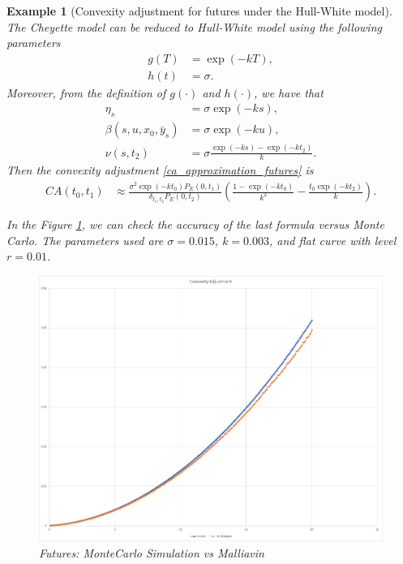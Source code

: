 \documentclass[a4paper,10pt]{article}
\newtheorem{example}[theorem]{Example}
\newcommand{\1}{\mathbf{1}}
\begin{document}
\begin{example}[Convexity adjustment for futures under the Hull-White model]\label{example_ca_future}
The Cheyette model can be reduced to Hull-White model using the following parameters
\begin{align*}
g(T) &= \exp(-kT), \\
h(t) &= \sigma.
\end{align*}
Moreover, from the definition of $g(\cdot)$ and $h(\cdot)$, we have that
\begin{align*}
\eta_s &= \sigma \exp(-ks),\\
\beta(s,u, x_0, \bar{y}_s) &= \sigma \exp(-ku),\\
\nu(s,t_2) &= \sigma \frac{\exp(-ks) - \exp(-kt_2)}{k}.
\end{align*}
Then the convexity adjustment \eqref{ca_approximation_futures} is
\begin{align*}
CA(t_0,t_1) & \approx \frac{\sigma^{2} \exp(-k t_0)  P_{E}(0,t_1)}{\delta_{t_1,t_2} P_{E}(0,t_2)} \left(\frac{1 - \exp(- k t_0)}{k^{2}} - \frac{t_0 \exp(-k t_2)}{k} \right).   
\end{align*}

In the Figure \ref{fig:Futures}, we can check the accuracy of the last formula versus Monte Carlo. The parameters used are $\sigma=0.015$, $k=0.003$, and flat curve with level $r=0.01$.

\begin{figure}[H]
	\begin{center}
		\includegraphics[scale=0.3]{Figures/future_convexity.jpg}
	\end{center}
	\caption{Futures: MonteCarlo Simulation vs Malliavin}
	\label{fig:Futures}
\end{figure} 
\end{example}
\end{document}
